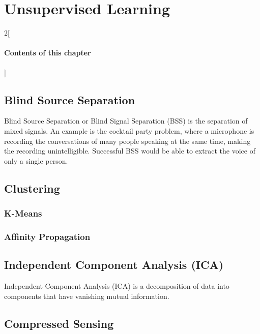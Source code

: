 \chapter{Unsupervised Learning}

\begin{multicols}{2}[\subsubsection*{Contents of this chapter}]
\end{multicols}

\section{Blind Source Separation}
Blind Source Separation or Blind Signal Separation (BSS) is the separation of mixed signals. An example is the cocktail party problem, where a microphone is recording the conversations of many people speaking at the same time, making the recording unintelligible. Successful BSS would be able to extract the voice of only a single person.  

\section{Clustering}

\subsection{K-Means}
\subsection{Affinity Propagation}

\section{Independent Component Analysis (ICA)}
Independent Component Analysis (ICA) is a decomposition of data into components that have vanishing mutual information. 

\section{Compressed Sensing}









\chapauthor{}	
